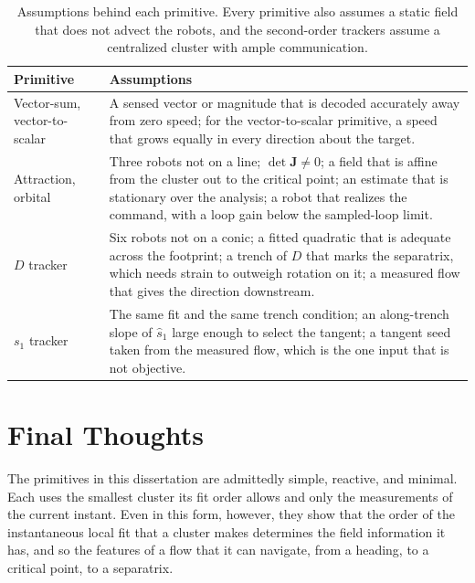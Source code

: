 \begin{table}[htbp]
\centering
\footnotesize
\caption{Assumptions behind each primitive. Every primitive also assumes a
static field that does not advect the robots, and the second-order trackers
assume a centralized cluster with ample communication.}
\label{tab:ch10:assumptions}
\begin{tabular}{>{\raggedright\arraybackslash}p{2.6cm} >{\raggedright\arraybackslash}p{12.0cm}}
\hline
Primitive & Assumptions \\
\hline
Vector-sum, vector-to-scalar & A sensed vector or magnitude that is decoded accurately away from zero speed; for the vector-to-scalar primitive, a speed that grows equally in every direction about the target. \\
Attraction, orbital & Three robots not on a line; $\det\mathbf{J} \neq 0$; a field that is affine from the cluster out to the critical point; an estimate that is stationary over the analysis; a robot that realizes the command, with a loop gain below the sampled-loop limit. \\
$D$ tracker & Six robots not on a conic; a fitted quadratic that is adequate across the footprint; a trench of $D$ that marks the separatrix, which needs strain to outweigh rotation on it; a measured flow that gives the direction downstream. \\
$s_1$ tracker & The same fit and the same trench condition; an along-trench slope of $\hat{s}_1$ large enough to select the tangent; a tangent seed taken from the measured flow, which is the one input that is not objective. \\
\hline
\end{tabular}
\end{table}

\section{Final Thoughts}
\label{sec:ch10:final}

The primitives in this dissertation are admittedly simple, reactive, and
minimal. Each uses the smallest cluster its fit order allows and only the
measurements of the current instant. Even in this form, however, they
show that the order of the instantaneous local fit that a cluster makes
determines the field information it has, and so the features of a flow that it can
navigate, from a heading, to a critical point, to a separatrix.

